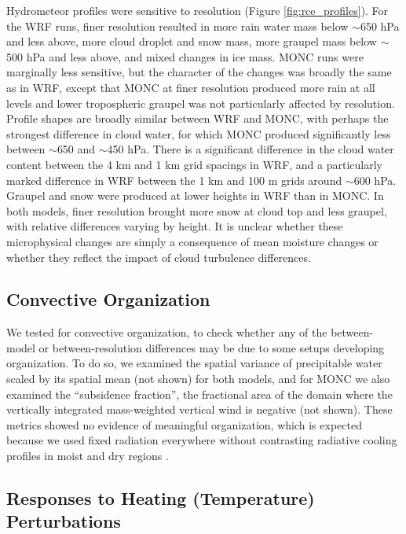 \documentclass[draft]{agujournal2019}
\begin{document}
Hydrometeor profiles were sensitive to resolution (Figure
\ref{fig:rce_profiles}). For the WRF runs, finer resolution resulted in more
rain water mass below $\sim$650 hPa and less above, more cloud droplet and snow
mass, more graupel mass below $\sim$500 hPa and less above, and mixed changes in
ice mass. MONC runs were marginally less sensitive, but the character of the
changes was broadly the same as in WRF, except that MONC at finer resolution
produced more rain at all levels and lower tropospheric graupel was not
particularly affected by resolution. Profile shapes are broadly similar between
WRF and MONC, with perhaps the strongest difference in cloud water, for which
MONC produced significantly less between $\sim$650 and $\sim$450 hPa. There is a
significant difference in the cloud water content between the 4 km and 1 km grid
spacings in WRF, and a particularly marked difference in WRF between the 1 km
and 100 m grids around $\sim$600 hPa. Graupel and snow were produced at lower
heights in WRF than in MONC. In both models, finer resolution brought more snow
at cloud top and less graupel, with relative differences varying by height. It
is unclear whether these microphysical changes are simply a consequence of mean
moisture changes or whether they reflect the impact of cloud turbulence
differences.

\subsection{Convective Organization}

We tested for convective organization, to check whether any of the between-model
or between-resolution differences may be due to some setups developing
organization. To do so, we examined the spatial variance of precipitable water
scaled by its spatial mean (not shown) for both models, and for MONC we also
examined the ``subsidence fraction'', the fractional area of the domain where
the vertically integrated mass-weighted vertical wind is negative (not shown).
These metrics showed no evidence of meaningful organization, which is expected
because we used fixed radiation everywhere without contrasting radiative cooling
profiles in moist and dry regions \cite{Muller_GRL_2015}.

\subsection{Responses to Heating (Temperature) Perturbations}
\end{document}
